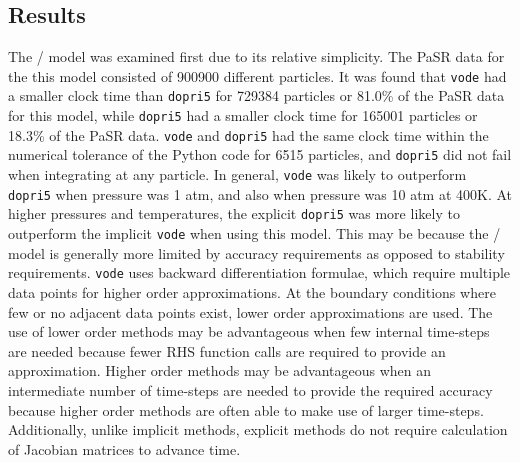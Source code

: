 \documentclass[12pt]{ussci}
\begin{document}
\subsection{Results}
The \slash {} model was examined first due to its relative simplicity.
The PaSR data for the this model consisted of 900900 different particles.
It was found that \texttt{vode} had a smaller clock time than \texttt{dopri5} for 729384 particles or 81.0\% of the PaSR data for this model, while \texttt{dopri5} had a smaller clock time for 165001 particles or 18.3\% of the PaSR data.
\texttt{vode} and \texttt{dopri5} had the same clock time within the numerical tolerance of the Python code for 6515 particles, and \texttt{dopri5} did not fail when integrating at any particle.
In general, \texttt{vode} was likely to outperform \texttt{dopri5} when pressure was 1 atm, and also when pressure was 10 atm at 400K.
At higher pressures and temperatures, the explicit \texttt{dopri5} was more likely to outperform the implicit \texttt{vode} when using this model.
This may be because the \slash {} model is generally more limited by accuracy requirements as opposed to stability requirements.
\texttt{vode} uses backward differentiation formulae, which require multiple data points for higher order approximations.
At the boundary conditions where few or no adjacent data points exist, lower order approximations are used.
The use of lower order methods may be advantageous when few internal time-steps are needed because fewer RHS function calls are required to provide an approximation.
Higher order methods may be advantageous when an intermediate number of time-steps are needed to provide the required accuracy because higher order methods are often able to make use of larger time-steps.
Additionally, unlike implicit methods, explicit methods do not require calculation of Jacobian matrices to advance time.
\end{document}

